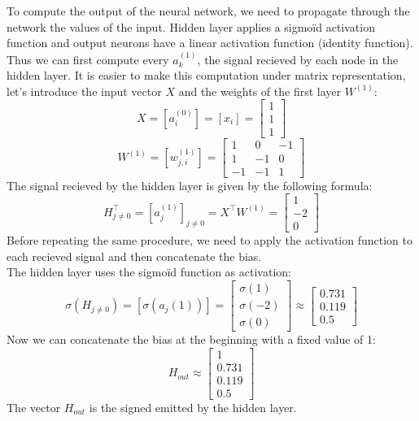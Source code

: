\documentclass[a4paper, 10pt]{article}
\begin{document}
To compute the output of the neural network, we need to propagate
through the network the values of the input. Hidden layer applies a sigmoïd activation function
and output neurons have a linear activation function (identity function).
\\
Thus we can first compute every $a_k^{(1)}$, the signal recieved by each node in the hidden layer.
It is easier to make this computation under matrix representation, let's introduce the input vector $X$ and
the weights of the first layer $W^{(1)}$:
$$
X = [a_i^{(0)}] = [x_i] =\begin{bmatrix}
    1\\
    1\\
    1
\end{bmatrix}
$$
$$
W^{(1)} = [w_{j,i}^{(1)}] =  \begin{bmatrix}
    1 & 0 & -1\\
    1 & -1 & 0\\
    -1 & -1 & 1
\end{bmatrix}
$$
The signal recieved by the hidden layer is given by the following formula:
$$
H_{j\ne0}^\top = [a_j^{(1)}]_{j\ne0} = X^\top W^{(1)} = \begin{bmatrix}
    1\\
    -2\\
    0
\end{bmatrix}
$$
Before repeating the same procedure, we need to apply the activation function
to each recieved signal and then concatenate the bias.
\\
The hidden layer uses the sigmoïd function as activation:
$$
\sigma(H_{j\ne0}) = [\sigma(a_j{(1)})] = \begin{bmatrix}
    \sigma(1)\\
    \sigma(-2)\\
    \sigma(0)
\end{bmatrix}
\approx \begin{bmatrix}
        0.731\\
        0.119\\
        0.5
\end{bmatrix}
$$
Now we can concatenate the bias at the beginning with a fixed value of 1:
$$
H_{out} \approx \begin{bmatrix}
    1\\
    0.731\\
    0.119\\
    0.5
\end{bmatrix}
$$
The vector $H_{out}$ is the signed emitted by the hidden layer.
\\
\end{document}
